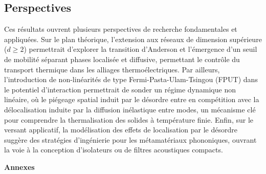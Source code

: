 \documentclass[11pt, a4paper, twoside]{article}
\begin{document}
\subsection{Perspectives}

Ces résultats ouvrent plusieurs perspectives de recherche fondamentales et appliquées. Sur le plan théorique, l'extension aux réseaux de dimension supérieure ($d \ge 2$) permettrait d'explorer la transition d'Anderson et l'émergence d'un seuil de mobilité séparant phases localisée et diffusive, permettant le contrôle du transport thermique dans les alliages thermoélectriques. Par ailleurs, l'introduction de non-linéarités de type Fermi-Pasta-Ulam-Tsingou (FPUT) dans le potentiel d'interaction permettrait de sonder un régime dynamique non linéaire, où le piégeage spatial induit par le désordre entre en compétition avec la délocalisation induite par la diffusion inélastique entre modes, un mécanisme clé pour comprendre la thermalisation des solides à température finie. Enfin, sur le versant applicatif, la modélisation des effets de localisation par le désordre suggère des stratégies d'ingénierie pour les métamatériaux phononiques, ouvrant la voie à la conception d'isolateurs ou de filtres acoustiques compacts.

\newpage

\printbibliography[heading=bibintoc]

\clearpage
\vspace*{\fill}
\begin{center}
    \huge\textbf{Annexes}
\end{center}
\vspace*{\fill}
\clearpage

\appendix
{}


% 


\end{document}
